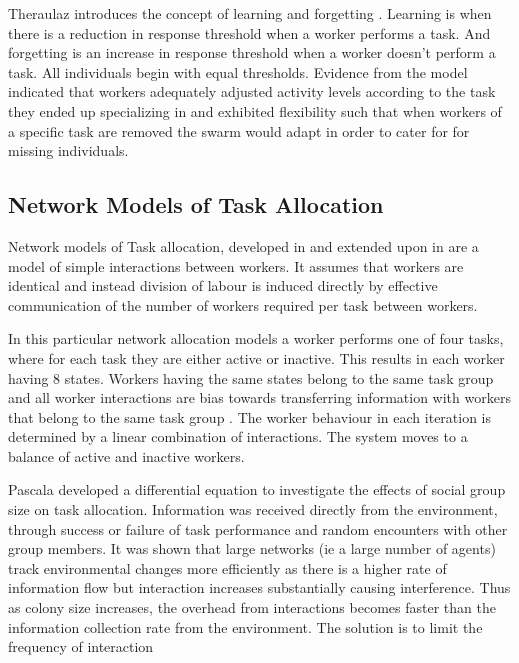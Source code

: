 Theraulaz introduces the concept of learning and forgetting \cite{theraulaz1998response}. Learning is when there is a reduction in response threshold when a worker performs a task. And forgetting is an increase in response threshold when a worker doesn't perform a task. All individuals begin with equal thresholds. Evidence from the model indicated that workers adequately adjusted activity levels according to the task they ended up specializing in and exhibited flexibility such that when workers of a specific task are removed the swarm would adapt in order to cater for for missing individuals. 

                                   
\subsection{Network Models of Task Allocation}

Network models of Task allocation, developed in \cite{gordon1992parallel} and extended upon in \cite{pacala1996effects} are a model of simple interactions between workers. It assumes that workers are identical and instead division of labour is induced directly by effective communication of the number of workers required per task between workers. 
 
In this particular network allocation models a worker performs one of four tasks, where for each task they are either active or inactive. This results in each worker having 8 states. Workers having the same states belong to the same task group and all worker interactions are bias towards transferring information with workers that belong to the same task group \cite{gordon1992parallel}. The worker behaviour in each iteration is determined by a linear combination of interactions. The system moves to a balance of active and inactive workers. 

Pascala \cite{pacala1996effects} developed a differential equation to investigate the effects of social group size on task allocation. Information was received directly from the environment, through success or failure of task performance and random encounters with other group members. It was shown that large networks (ie a large number of agents) track environmental changes more efficiently as there is a higher rate of information flow but interaction increases substantially causing interference. Thus as colony size increases, the overhead from interactions becomes faster than the information collection rate from the environment. The solution is to limit the frequency of interaction \cite{pacala1996effects}


